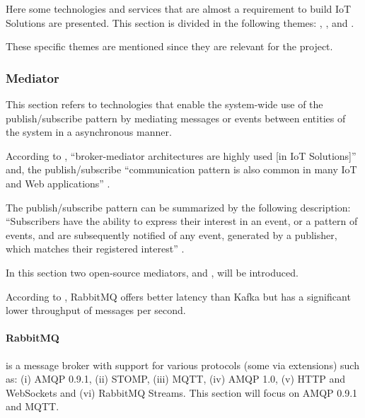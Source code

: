 Here some technologies and services that are almost a requirement to build \gls{IoT} Solutions are presented. This section is divided in the following themes: , ,  and .

These specific themes are mentioned since they are relevant for the project.

\subsubsection{Mediator}
\label{subsubsec:stateofart:arch:infra:mediator}

This section refers to technologies that enable the system-wide use of the publish/subscribe pattern by mediating messages or events between entities of the system in a asynchronous manner.

According to \cite{DIAS2022100529}, ``broker-mediator architectures are highly used [in \gls{IoT} Solutions]'' and, the publish/subscribe ``communication pattern is also common in many IoT and Web applications'' \parencite{LAZIDIS2022100538}. 

The publish/subscribe pattern can be summarized by the following description: ``Subscribers have the ability to express their interest in an event, or a pattern of events, and are subsequently notified of any event, generated by a publisher, which matches their registered interest'' \parencite{10.1145857076.857078}.

In this section two open-source mediators,  and , will be introduced.

According to \cite{LAZIDIS2022100538}, RabbitMQ offers better latency than Kafka but has a significant lower throughput of messages per second.

\paragraph{RabbitMQ}
\label{par:stateofart:arch:infra:mediator:rabbitmq}

 is a message broker with support for various protocols (some via extensions) such as: (i) \gls{AMQP} 0.9.1, (ii) STOMP, (iii) \gls{MQTT}, (iv) \gls{AMQP} 1.0, (v) HTTP and WebSockets and (vi) RabbitMQ Streams. This section will focus on \gls{AMQP} 0.9.1 and \gls{MQTT}.

